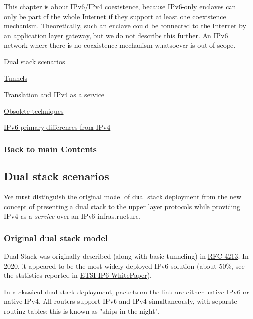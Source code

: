 \documentclass[
]{article}
\begin{document}
This chapter is about IPv6/IPv4 coexistence, because IPv6-only enclaves
can only be part of the whole Internet if they support at least one
coexistence mechanism. Theoretically, such an enclave could be connected
to the Internet by an application layer gateway, but we do not describe
this further. An IPv6 network where there is no coexistence mechanism
whatsoever is out of scope.

\hyperref[dual-stack-scenarios]{Dual stack scenarios}

\hyperref[tunnels]{Tunnels}

\hyperref[translation-and-ipv4-as-a-service]{Translation and IPv4 as a
service}

\hyperref[obsolete-techniques]{Obsolete techniques}

\hyperref[ipv6-primary-differences-from-ipv4]{IPv6 primary differences
from IPv4}

\subsubsection{\texorpdfstring{\hyperref[list-of-contents]{Back to main
Contents}}{Back to main Contents}}\label{back-to-main-contents-2}

\pagebreak

\subsection{Dual stack scenarios}\label{dual-stack-scenarios}

We must distinguish the original model of dual stack deployment from the
new concept of presenting a dual stack to the upper layer protocols
while providing IPv4 as a \emph{service} over an IPv6 infrastructure.

\subsubsection{Original dual stack
model}\label{original-dual-stack-model}

Dual-Stack was originally described (along with basic tunneling) in
\href{https://www.rfc-editor.org/rfc/rfc4213}{RFC 4213}. In 2020, it
appeared to be the most widely deployed IPv6 solution (about 50\%, see
the statistics reported in
\href{https://www.etsi.org/images/files/ETSIWhitePapers/etsi_WP35_IPv6_Best_Practices_Benefits_Transition_Challenges_and_the_Way_Forward.pdf}{ETSI-IP6-WhitePaper}).

In a classical dual stack deployment, packets on the link are either
native IPv6 or native IPv4. All routers support IPv6 and IPv4
simultaneously, with separate routing tables: this is known as "ships in
the night".
\end{document}
